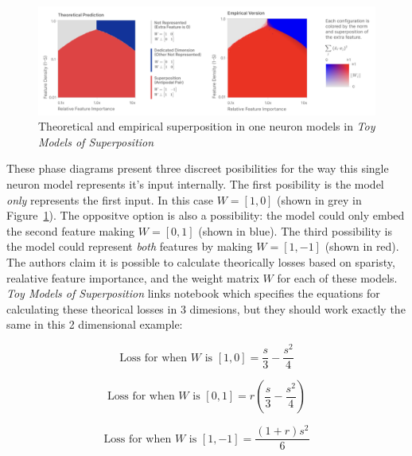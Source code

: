 \documentclass{article} %
\begin{document}
\begin{figure}[h]
    \centering
    \includegraphics[width=0.99\linewidth]{phase_changes/images/phase_changes_anthropic.png}
    \captionsetup{font=footnotesize, width=0.7\linewidth} %
    \caption{
        Theoretical and empirical superposition in one neuron models in 
        \textit{Toy Models of Superposition}\cite{elhage2022toy}
    }
    \label{fig:section4_anthropic}
\end{figure}

These phase diagrams present three discreet posibilities for the way this single
neuron model represents it's input internally. The first posibility is the model 
\textit{only} represents the first input. In this case $W = [1, 0]$ (shown in
grey in Figure~\ref{fig:section4_anthropic}). The oppositve option is also a 
possibility: the model could only embed the second feature making $W = [0, 1]$ 
(shown in blue). The third possibility is the model could represent \textit{both}
features by making $W = [1, -1]$ (shown in red). \\

The authors claim it is possible to calculate theorically losses based on sparisty,
realative feature importance, and the weight matrix $W$ for each of these models. 
\textit{Toy Models of Superposition} links notebook which specifies
the equations for calculating these theorical losses in 3 dimesions, but they
should work exactly the same in this 2 dimensional example:

\begin{equation}
    \label{eq:loss1}
    \text{Loss for when  $W$ is $[1, 0]$} = \frac{s}{3} - \frac{s^2}{4}
\end{equation}

\begin{equation}
    \label{eq:loss2}
    \text{Loss for when  $W$ is $[0, 1]$} = r \left(\frac{s}{3} - \frac{s^2}{4}\right)
\end{equation}

\begin{equation}
    \label{eq:loss3}
    \text{Loss for when  $W$ is $[1, -1]$} = \frac{(1 + r)s^2}{6}
\end{equation}
\end{document}

